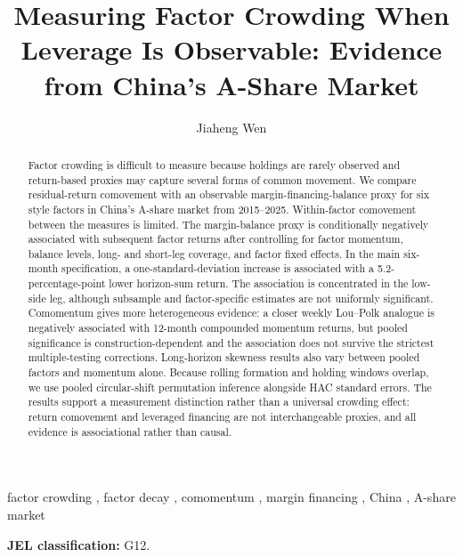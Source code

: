 \documentclass[final,1p,authoryear]{elsarticle}
\begin{document}
\begin{frontmatter}

\title{Measuring Factor Crowding When Leverage Is Observable:
       Evidence from China's A-Share Market}

\author[tongji]{Jiaheng Wen}
\address[tongji]{Tongji University, Shanghai, China}

\begin{abstract}
Factor crowding is difficult to measure because holdings are rarely observed and return-based proxies may capture several forms of common movement. We compare residual-return comovement with an observable margin-financing-balance proxy for six style factors in China's A-share market from 2015--2025. Within-factor comovement between the measures is limited. The margin-balance proxy is conditionally negatively associated with subsequent factor returns after controlling for factor momentum, balance levels, long- and short-leg coverage, and factor fixed effects. In the main six-month specification, a one-standard-deviation increase is associated with a 5.2-percentage-point lower horizon-sum return. The association is concentrated in the low-side leg, although subsample and factor-specific estimates are not uniformly significant. Comomentum gives more heterogeneous evidence: a closer weekly Lou--Polk analogue is negatively associated with 12-month compounded momentum returns, but pooled significance is construction-dependent and the association does not survive the strictest multiple-testing corrections. Long-horizon skewness results also vary between pooled factors and momentum alone. Because rolling formation and holding windows overlap, we use pooled circular-shift permutation inference alongside HAC standard errors. The results support a measurement distinction rather than a universal crowding effect: return comovement and leveraged financing are not interchangeable proxies, and all evidence is associational rather than causal.
\end{abstract}

\begin{keyword}
factor crowding \sep{} factor decay \sep{} comomentum \sep{} margin financing \sep{} China \sep{} A-share market
\end{keyword}
\noindent\textbf{JEL classification:} G12.

\end{frontmatter}

\end{document}
